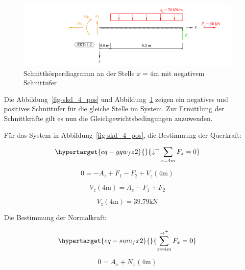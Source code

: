 \documentclass[
  12pt,
  letterpaper,
  DIV=11,
  egregdoesnotlikesansseriftitles]{scrartcl}
\begin{document}
\begin{figure}[H]

{\centering \includegraphics{BSI_HS23_Testat_01_files/mediabag/../images/Testat_01_HS23_SKD_2.pdf}

}

\caption{\label{fig-skd_4_neg}Schnittkörperdiagramm an der Stelle
\(x=4\)m mit negativem Schnittufer}

\end{figure}

Die Abbildung~\ref{fig-skd_4_pos} und Abbildung~\ref{fig-skd_4_neg}
zeigen ein negatives und positives Schnittufer für die gleiche Stelle im
System. Zur Ermittlung der Schnittkräfte gilt es nun die
Gleichgewichtsbedingungen anzuwenden.

Für das System in Abbildung~\ref{fig-skd_4_pos}, die Bestimmung der
Querkraft:

\begin{equation}\protect\hypertarget{eq-ggw_fz2}{}{
{\downarrow^+}\sum_{x=4m} F_z = 0
}\label{eq-ggw_fz2}\end{equation}

\begin{equation}0 = - A_{z} + F_{1} - F_{2} + V_{z}{\left(4 \text{m} \right)}\end{equation}

\begin{equation}V_{z}{\left(4 \text{m} \right)} = A_{z} - F_{1} + F_{2}\end{equation}

\begin{equation}V_{z}{\left(4 \text{m} \right)} = 39.79 \text{k} \text{N}\end{equation}

Die Bestimmung der Normalkraft:

\begin{equation}\protect\hypertarget{eq-sum_fx2}{}{
\sum_{x=4m}^{\rightarrow^+} F_x = 0
}\label{eq-sum_fx2}\end{equation}

\begin{equation}0 = A_{x} + N_{x}{\left(4 \text{m} \right)}\end{equation}
\end{document}
